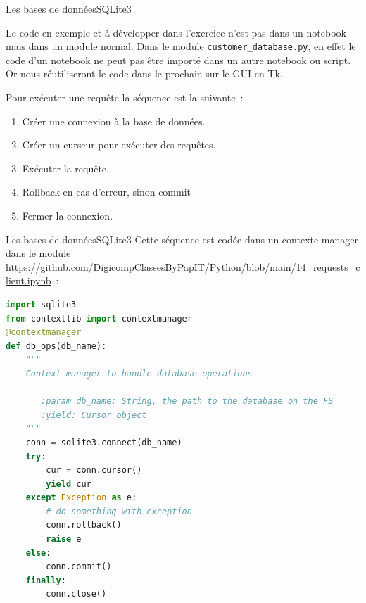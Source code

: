 \documentclass{beamer}
\begin{document}
    \begin{frame}{Les bases de données}{SQLite3}
        \begin{dangercolorbox}
            Le code en exemple et à développer dans l'exercice n'est pas dans un notebook mais dans un module normal.
            Dans le module \lstinline{customer_database.py}, en effet le code d'un notebook ne peut pas être importé dans un autre notebook ou script.
            Or nous réutiliseront le code dans le prochain sur le GUI en Tk.
        \end{dangercolorbox}
        \bigbreak
        Pour exécuter une requête la séquence est la suivante~:
        \begin{enumerate}
            \item Créer une connexion à la base de données.
            \item Créer un curseur pour exécuter des requêtes.
            \item Exécuter la requête.
            \item Rollback en cas d'erreur, sinon commit
            \item Fermer la connexion.
        \end{enumerate}
    \end{frame}

    \begin{frame}[fragile]{Les bases de données}{SQLite3}
        Cette séquence est codée dans un contexte manager dans le module \url{https://github.com/DigicompClassesByPapIT/Python/blob/main/14_requests_client.ipynb}~:
        \begin{lstlisting}[language=Python,basicstyle=\tiny\ttfamily]
import sqlite3
from contextlib import contextmanager
@contextmanager
def db_ops(db_name):
    """
    Context manager to handle database operations

       :param db_name: String, the path to the database on the FS
       :yield: Cursor object
    """
    conn = sqlite3.connect(db_name)
    try:
        cur = conn.cursor()
        yield cur
    except Exception as e:
        # do something with exception
        conn.rollback()
        raise e
    else:
        conn.commit()
    finally:
        conn.close()
        \end{lstlisting}
    \end{frame}
\end{document}
